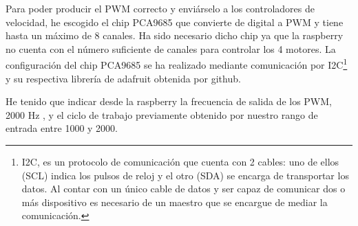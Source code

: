 Para poder producir el PWM correcto y enviárselo a los controladores de velocidad, he escogido el chip PCA9685 que convierte de digital a PWM y tiene hasta un máximo de 8 canales. Ha sido necesario dicho chip ya que la raspberry no cuenta con el número suficiente de canales para controlar los 4 motores.
La configuración del chip PCA9685 se ha realizado mediante comunicación por I2C\footnote{I2C, es un protocolo de comunicación que cuenta con 2 cables: uno de ellos (SCL) indica los pulsos de reloj y el otro (SDA) se encarga de transportar los datos. Al contar con un único cable de datos y ser capaz de comunicar dos o más dispositivo es necesario de un maestro que se encargue de mediar la comunicación.} y su respectiva librería de adafruit obtenida por github. 

He tenido que indicar desde la raspberry la frecuencia de salida de los PWM, 2000 Hz , y el ciclo de trabajo previamente obtenido por nuestro rango de entrada entre 1000 y 2000.\cite{Industries}
